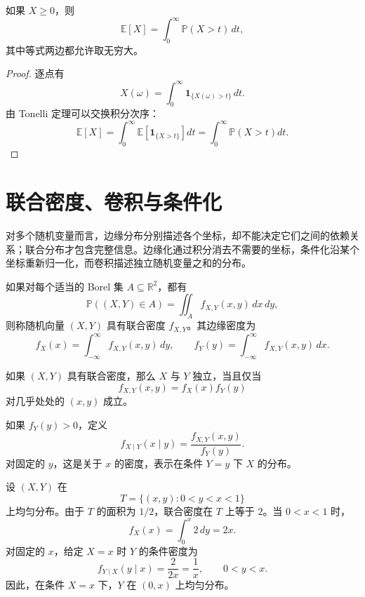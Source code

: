 \begin{theorem}[尾积分公式]
如果 $X\geq0$，则
\[
    \mathbb{E}[X]=\int_0^\infty\mathbb{P}(X>t)\,dt,
\]
其中等式两边都允许取无穷大。
\end{theorem}

\begin{proof}
逐点有
\[
    X(\omega)=\int_0^\infty
    \mathbf{1}_{\{X(\omega)>t\}}\,dt.
\]
由 Tonelli 定理可以交换积分次序：
\[
    \mathbb{E}[X]
    =\int_0^\infty
    \mathbb{E}[\mathbf{1}_{\{X>t\}}]dt
    =\int_0^\infty\mathbb{P}(X>t)dt.
\]
\end{proof}

\section{联合密度、卷积与条件化}

对多个随机变量而言，边缘分布分别描述各个坐标，却不能决定它们之间的依赖关系；联合分布才包含完整信息。边缘化通过积分消去不需要的坐标，条件化沿某个坐标重新归一化，而卷积描述独立随机变量之和的分布。

\begin{definition}[联合密度]
如果对每个适当的 Borel 集 $A\subseteq\mathbb{R}^2$，都有
\[
    \mathbb{P}((X,Y)\in A)
    =\iint_A f_{X,Y}(x,y)\,dx\,dy,
\]
则称随机向量 $(X,Y)$ 具有联合密度 $f_{X,Y}$。其边缘密度为
\[
    f_X(x)=\int_{-\infty}^{\infty}f_{X,Y}(x,y)\,dy,
    \qquad
    f_Y(y)=\int_{-\infty}^{\infty}f_{X,Y}(x,y)\,dx.
\]
\end{definition}

\begin{theorem}[独立性的密度判据]
如果 $(X,Y)$ 具有联合密度，那么 $X$ 与 $Y$ 独立，当且仅当
\[
    f_{X,Y}(x,y)=f_X(x)f_Y(y)
\]
对几乎处处的 $(x,y)$ 成立。
\end{theorem}

\begin{definition}[条件密度]
如果 $f_Y(y)>0$，定义
\[
    f_{X\mid Y}(x\mid y)
    =\frac{f_{X,Y}(x,y)}{f_Y(y)}.
\]
对固定的 $y$，这是关于 $x$ 的密度，表示在条件 $Y=y$ 下 $X$ 的分布。
\end{definition}

\begin{example}[三角形上的均匀分布]
设 $(X,Y)$ 在
\[
    T=\{(x,y):0<y<x<1\}
\]
上均匀分布。由于 $T$ 的面积为 $1/2$，联合密度在 $T$ 上等于 $2$。当 $0<x<1$ 时，
\[
    f_X(x)=\int_0^x2\,dy=2x.
\]
对固定的 $x$，给定 $X=x$ 时 $Y$ 的条件密度为
\[
    f_{Y\mid X}(y\mid x)=\frac{2}{2x}=\frac1x,
    \qquad0<y<x.
\]
因此，在条件 $X=x$ 下，$Y$ 在 $(0,x)$ 上均匀分布。
\end{example}

